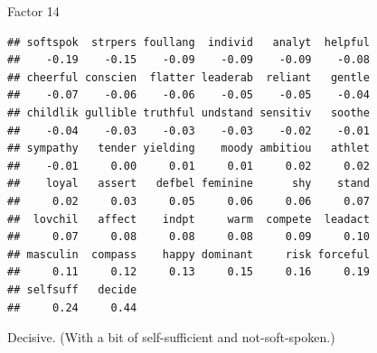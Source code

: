 \begin{frame}[fragile]{Factor 14}
  
  {\small
\begin{knitrout}
\color{fgcolor}\begin{kframe}
\begin{alltt}
\hlstd{mylist[[}\hlstd{]]}
\end{alltt}
\begin{verbatim}
## softspok  strpers foullang  individ   analyt  helpful 
##    -0.19    -0.15    -0.09    -0.09    -0.09    -0.08 
## cheerful conscien  flatter leaderab  reliant   gentle 
##    -0.07    -0.06    -0.06    -0.05    -0.05    -0.04 
## childlik gullible truthful undstand sensitiv   soothe 
##    -0.04    -0.03    -0.03    -0.03    -0.02    -0.01 
## sympathy   tender yielding    moody ambitiou   athlet 
##    -0.01     0.00     0.01     0.01     0.02     0.02 
##    loyal   assert   defbel feminine      shy    stand 
##     0.02     0.03     0.05     0.06     0.06     0.07 
##  lovchil   affect    indpt     warm  compete  leadact 
##     0.07     0.08     0.08     0.08     0.09     0.10 
## masculin  compass    happy dominant     risk forceful 
##     0.11     0.12     0.13     0.15     0.16     0.19 
## selfsuff   decide 
##     0.24     0.44
\end{verbatim}
\end{kframe}
\end{knitrout}
}

Decisive. (With a bit of self-sufficient and not-soft-spoken.)

\end{frame}
